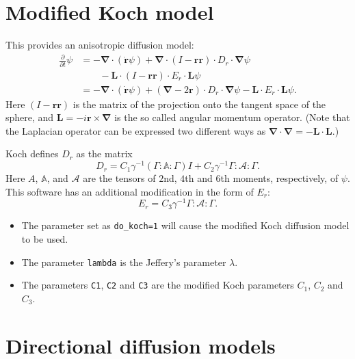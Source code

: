 \documentclass{amsart}
\newcommand{\br}{{\mathbf r}}
\newcommand{\bnabla}{{\boldsymbol \nabla}}
\begin{document}
\section*{Modified Koch model}

\noindent
This provides an anisotropic diffusion model:
\begin{align*}
\frac\partial{\partial t}\psi &= - \bnabla\cdot(\dot\br \psi) + \bnabla\cdot(I-\br\br)\cdot D_r\cdot\bnabla\psi \\
&\qquad - \mathbf L\cdot(I-\br\br)\cdot E_r\cdot\mathbf L \psi \\
& = - \bnabla\cdot(\dot\br \psi) + (\bnabla-2\br)\cdot D_r\cdot\bnabla\psi - \mathbf L \cdot E_r \cdot \mathbf L \psi .
\end{align*}
Here $(I-\br\br)$ is the matrix of the projection onto the tangent space of the sphere, and $\mathbf L = -i \br \times \bnabla$ is the so called angular momentum operator.  (Note that the Laplacian operator can be expressed two different ways as $\bnabla\cdot\bnabla = -\mathbf L \cdot \mathbf L$.)

Koch \cite{koch} defines $D_r$ as the matrix
$$ D_r = C_1 \gamma^{-1} (\Gamma: \mathbb A:\Gamma) I + C_2 \gamma^{-1} \Gamma: \mathcal A:\Gamma .$$
Here $A$, $\mathbb A$, and $\mathcal A$ are the tensors of $2$nd, $4$th and $6$th moments, respectively, of $\psi$.  This software has an additional modification in the form of $E_r$:
$$ E_r = C_3 \gamma^{-1} \Gamma: \mathcal A:\Gamma .$$
\begin{itemize}
\item The parameter set as {\tt do\_koch=1} will cause the modified Koch diffusion model to be used.
\item The parameter {\tt lambda} is the Jeffery's parameter $\lambda$.
\item The parameters {\tt C1}, {\tt C2} and {\tt C3} are the modified Koch parameters $C_1$, $C_2$ and $C_3$.
\end{itemize}

\section*{Directional diffusion models}
\end{document}
